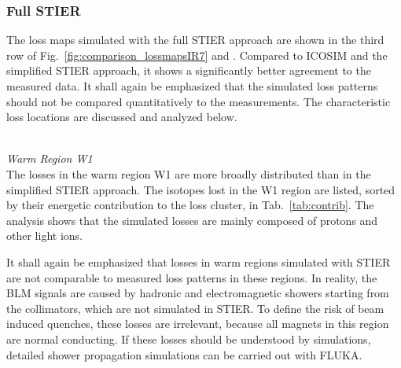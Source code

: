 


\subsubsection{Full STIER}

The loss maps simulated with the full STIER approach are shown in the third row of Fig.~\ref{fig:comparison_lossmapsIR7} and . Compared to ICOSIM and the simplified STIER approach, it shows a significantly better agreement to the measured data. It shall again be emphasized that the simulated loss patterns should not be compared quantitatively to the measurements. The characteristic loss locations are discussed and analyzed below.

\mbox{} \\ 
\textit{Warm Region W1}
\\ 
The losses in the warm region W1 are more broadly distributed than in the simplified STIER approach. The isotopes lost in the W1 region are listed, sorted by their energetic contribution to the loss cluster, in Tab.~\ref{tab:contrib}. The analysis shows that the simulated losses are mainly composed of protons and other light ions. 

It shall again be emphasized that losses in warm regions simulated with STIER are not comparable to measured loss patterns in these regions. In reality, the BLM signals are caused by hadronic and electromagnetic showers starting from the collimators, which are not simulated in STIER. To define the risk of beam induced quenches, these losses are irrelevant, because all magnets in this region are normal conducting. If these losses should be understood by simulations, detailed shower propagation simulations can be carried out with FLUKA. 

